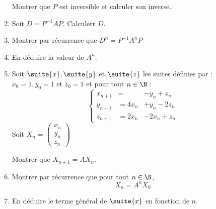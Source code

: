 \documentclass[a4paper, 11pt,reqno]{article}
\begin{document}
\begin{exercice}
\begin{enumerate}
 Montrer que $P$ est inversible et calculer son inverse. 
 \item Soit $D=P^{-1}AP$. Calculerr $D$. 
 \item Montrer par récurrence que $D^n = P^{-1}A^n P$
 \item En déduire la valeur de $A^n$. 
\item Soit $\suite{x}, \suite{y} $ et $\suite{z}$ les suites définies par : 
$x_0=1, y_0=1 $ et $z_0=1$ et pour tout $n\in \N$ :
$$\left\{
\begin{array}{cll}
x_{n+1} &= &-y_n+z_n\\
y_{n+1}&=4x_n&+y_n-2z_n\\
z_{n+1}&=2x_n&-2x_n+z_n
\end{array}
 \right.$$ 
Soit $X_n = \left(
\begin{array}{c}
x_{n}\\
y_{n}\\
z_{n}
\end{array}
 \right)$
 
Montrer que $X_{n+1} = A X_n$. 
\item Montrer par récurrence que pour tout $n\in \N$, $$X_n = A^n X_0$$
\item En déduire le terme général de $\suite{x}$ en fonction de $n$. 
\end{enumerate} 
\end{exercice}
\end{document}
